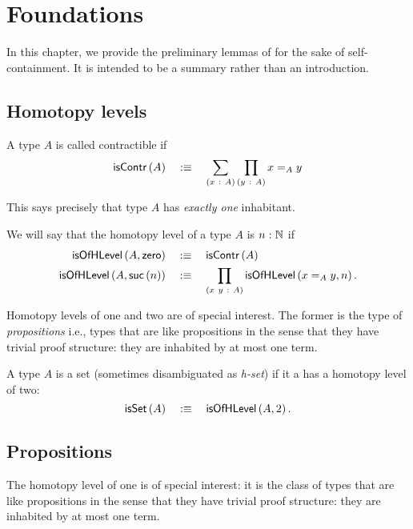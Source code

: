 \chapter{Foundations}\label{chap:foundations}

In this chapter, we provide the preliminary lemmas of \UF{} for the sake of
self-containment. It is intended to be a summary rather than an introduction.

\section{Homotopy levels}

\begin{defn}[Contractible]
  A type $A$ is called contractible if
  \begin{equation*}
    \mathsf{isContr}\left(A\right) \quad:\equiv\quad \sum_{(x~:~A)} \prod_{(y~:~A)} x =_A y
  \end{equation*}
\end{defn}

This says precisely that type $A$ has \emph{exactly one} inhabitant.

\begin{defn}
  We will say that the homotopy level of a type $A$ is $n\hspace{0.1mm}:\hspace{0.1mm}\mathbb{N}$ if
  \begin{align*}
    \mathsf{isOfHLevel}\left(A, \mathsf{zero}{}\right) &\quad:\equiv\quad \mathsf{isContr}\left(A\right)\\
    \mathsf{isOfHLevel}\left(A, \mathsf{suc}\left(n\right)\right) &\quad:\equiv\quad \prod_{(x~y~:~A)} \mathsf{isOfHLevel}\left(x =_A y, n\right).
  \end{align*}
\end{defn}

Homotopy levels of one and two are of special interest. The former is the type of
\emph{propositions} i.e., types that are like propositions in the sense that they have
trivial proof structure: they are inhabited by at most one term.

\begin{defn}
  A type $A$ is a set (sometimes disambiguated as \emph{h-set}) if it a has a homotopy
  level of two:
  \begin{equation*}
    \mathsf{isSet}\left(A\right) \quad:\equiv\quad \mathsf{isOfHLevel}\left(A, 2\right).
  \end{equation*}
\end{defn}

\section{Propositions}

The homotopy level of one is of special interest: it is the class of types that are like
propositions in the sense that they have trivial proof structure: they are inhabited by at
most one term.

